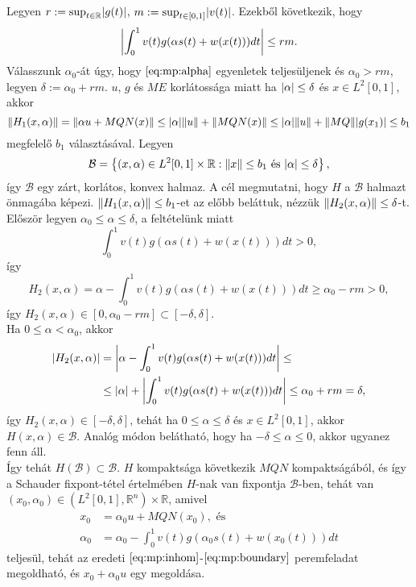 \documentclass[oneside, titlepage, 12pt, a4paper]{report}
\DeclarePairedDelimiter\norm{\lVert}{\rVert}	%
\DeclarePairedDelimiter\abs{\lvert}{\rvert}	%
\begin{document}
Legyen $r := \sup_{t \in \mathbb{R}} \abs{g(t)}$, $m := \sup_{t \in [0, 1]} \abs{v(t)}$. Ezekből következik, hogy
\begin{equation*}
\abs*{ \int_0^1 v(t) g(\alpha s(t) + w(x(t))) dt} \leq rm.
\end{equation*}
Válasszunk $\alpha_0$-át úgy, hogy $\eqref{eq:mp:alpha}$ egyenletek teljesüljenek és $\alpha_0 > rm$, legyen $\delta := \alpha_0 + rm$. $u$, $g$ és $M E$ korlátossága miatt ha $\abs{\alpha} \leq \delta$ és $x \in L^2[0, 1]$, akkor
\begin{equation*}
\norm{H_1 (x, \alpha)} = \norm{ \alpha u + M Q N (x)} \leq \abs{\alpha} \norm{u} + \norm{M Q N (x)} \leq \abs{\alpha} \norm{u} + \norm{M Q} \abs{g(x_1)} \leq b_1
\end{equation*}
megfelelő $b_1$ választásával. Legyen
\begin{equation*}
\mathcal{B} = \left\{ (x, \alpha) \in L^2[0, 1] \times \mathbb{R} : \norm{x} \leq b_1 \text{ és } \abs{\alpha} \leq \delta \right\},
\end{equation*}
így $\mathcal{B}$ egy zárt, korlátos, konvex halmaz. A cél megmutatni, hogy $H$ a $\mathcal{B}$ halmazt önmagába képezi. $\norm{H_1(x, \alpha)} \leq b_1$-et az előbb beláttuk, nézzük $\norm{H_2(x, \alpha)} \leq \delta$-t. \\
Először legyen $\alpha_0 \leq \alpha \leq \delta$, a feltételünk miatt
\begin{equation*}
\int_0^1 v(t) g(\alpha s(t) + w(x(t))) dt > 0,
\end{equation*}
így
\begin{equation*}
H_2(x, \alpha) = \alpha - \int_0^1 v(t) g(\alpha s(t) + w(x(t))) dt \geq \alpha_0 - rm > 0,
\end{equation*}
így $H_2(x, \alpha) \in [0, \alpha_0 - rm] \subset [-\delta, \delta]$. \\
Ha $0 \leq \alpha < \alpha_0$, akkor
\begin{align*}
\abs{H_2(x, \alpha)} &= \abs*{ \alpha - \int_0^1 v(t) g(\alpha s(t) + w(x(t))) dt } \leq \\
 &\leq \abs{\alpha} + \abs*{\int_0^1 v(t) g(\alpha s(t) + w(x(t))) dt} \leq \alpha_0 + rm = \delta,
\end{align*}
így $H_2(x, \alpha) \in [-\delta, \delta]$, tehát ha $0 \leq \alpha \leq \delta$ és $x \in L^2[0, 1]$, akkor $H(x, \alpha) \in \mathcal{B}$. Analóg módon belátható, hogy ha $-\delta \leq \alpha \leq 0$, akkor ugyanez fenn áll. \\
Így tehát $H(\mathcal{B}) \subset \mathcal{B}$. $H$ kompaktsága következik $M Q N$ kompaktságából, és így a Schauder fixpont-tétel értelmében $H$-nak van fixpontja $\mathcal{B}$-ben, tehát van $(x_0, \alpha_0) \in ( L^2[0, 1], \mathbb{R}^n) \times \mathbb{R}$, amivel
\begin{align*}
x_0 &= \alpha_0 u + M Q N (x_0), \text{ és} \\
\alpha_0 &= \alpha_0 - \int_0^1 v(t) g(\alpha_0 s(t) + w(x_0(t))) dt
\end{align*}
teljesül, tehát az eredeti $\eqref{eq:mp:inhom}$-$\eqref{eq:mp:boundary}$ peremfeladat megoldható, és $x_0 + \alpha_0 u$ egy megoldása.
\end{document}
